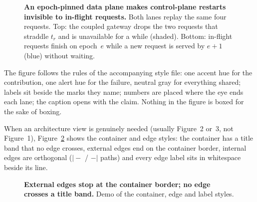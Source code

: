 \documentclass[10pt,twocolumn]{article}
\begin{document}
\begin{figure}[t]
\caption{\textbf{An epoch-pinned data plane makes control-plane restarts invisible to in-flight
requests.} Both lanes replay the same four requests. Top: the coupled gateway drops the two
requests that straddle $t_r$ and is unavailable for a while (shaded). Bottom: in-flight requests
finish on epoch~$e$ while a new request is served by $e{+}1$ (\textcolor{tvfOurs}{blue}) without waiting.}
\label{fig:demo}
\end{figure}

The figure follows the rules of the accompanying style file: one accent hue for the
contribution, one alert hue for the failure, neutral gray for everything shared; labels sit
beside the marks they name; numbers are placed where the eye ends each lane; the caption opens
with the claim. Nothing in the figure is boxed for the sake of boxing.

When an architecture view is genuinely needed (usually Figure~2 or~3, not Figure~1),
Figure~\ref{fig:demo-arch} shows the container and edge styles: the container has a title band
that no edge crosses, external edges end on the container border, internal edges are
orthogonal ($|\!-$ / $-\!|$ paths) and every edge label sits in whitespace beside its line.

\begin{figure}[t]
\centering
{}
\caption{\textbf{External edges stop at the container border; no edge crosses a title band.}
Demo of the container, edge and label styles.}
\label{fig:demo-arch}
\end{figure}
\end{document}
